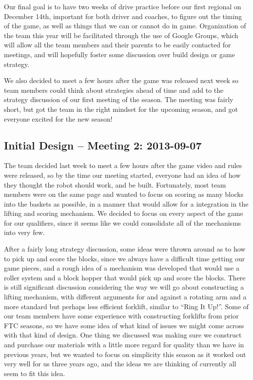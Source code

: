 \documentclass{article}
\begin{document}
Our final goal is to have two weeks of drive practice before our first regional on December 14th, important for both driver and coaches, to figure out the timing of the game, as well as things that we can or cannot do in game. Organization of the team this year will be facilitated through the use of Google Groups, which will allow all the team members and their parents to be easily contacted for meetings, and will hopefully foster some discussion over build design or game strategy. 

We also decided to meet a few hours after the game was released next week so team members could think about strategies ahead of time and add to the strategy discussion of our first meeting of the season. The meeting was fairly short, but got the team in the right mindset for the upcoming season, and got everyone excited for the  new season!

\newpage
\subsection{Initial Design -- Meeting 2: 2013-09-07}
The team decided last week to meet a few hours after the game video and rules were released, so by the time our meeting started, everyone had an idea of how they thought the robot should work, and be built. Fortunately, most team members were on the same page and wanted to focus on scoring as many blocks into the baskets as possible, in a manner that would allow for a integration in the lifting and scoring mechanism. We decided to focus on every aspect of the game for our qualifiers, since it seems like we could consolidate all of the mechanisms into very few.

After a fairly long strategy discussion, some ideas were thrown around as to how to pick up and score the blocks, since we always have a difficult time getting our game pieces, and a rough idea of a mechanism was developed that would use a roller system and a block hopper that would pick up and score the blocks. There is still significant discussion considering the way we will go about constructing a lifting mechanism, with different arguments for and against a rotating arm and a more standard but perhaps less efficient forklift, similar to ``Ring It Up!''. Some of our team members have some experience with constructing forklifts from prior FTC seasons, so we have some idea of what kind of issues we might come across with that kind of design. One thing we discussed was making sure we construct and purchase our materials with a little more regard for quality than we have in previous years, but we wanted to focus on simplicity this season as it worked out very well for us three years ago, and the ideas we are thinking of currently all seem to fit this idea.
\end{document}

